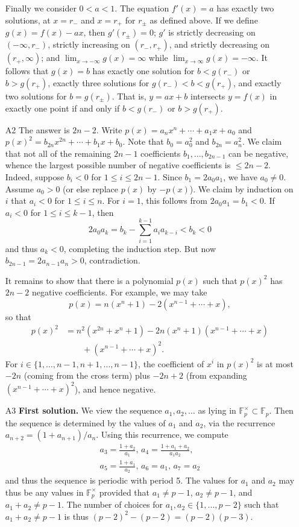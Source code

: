 \documentclass[amssymb,twocolumn,pra,10pt,aps]{revtex4-1}
\begin{document}
\begin{itemize}
Finally we consider $0<a<1$. The equation $f'(x) = a$ has exactly two solutions, at $x=r_-$ and $x=r_+$ for $r_{\pm}$ as defined above.
If we define $g(x) = f(x)-ax$, then $g'(r_\pm)=0$; $g'$ is strictly decreasing on $(-\infty,r_-)$, strictly increasing on $(r_-,r_+)$, and strictly decreasing on $(r_+,\infty)$; and $\lim_{x\to-\infty} g(x) = \infty$ while $\lim_{x\to\infty} g(x) = -\infty$. It follows that $g(x)=b$ has exactly one solution for $b<g(r_-)$ or $b>g(r_+)$, exactly three solutions for $g(r_-)<b<g(r_+)$, and exactly two solutions for $b = g(r_\pm)$. That is, $y=ax+b$ intersects $y=f(x)$ in exactly one point if and only if $b<g(r_-)$ or $b>g(r_+)$.

\item[A2]
The answer is $2n-2$. Write $p(x) = a_nx^n+\cdots+a_1x+a_0$ and $p(x)^2 = b_{2n}x^{2n}+\cdots+b_1x+b_0$. Note that $b_0 = a_0^2$ and $b_{2n} = a_n^2$. We claim that not all of the remaining $2n-1$ coefficients $b_1,\ldots,b_{2n-1}$ can be negative, whence the largest possible number of negative coefficients is $\leq 2n-2$. Indeed, suppose $b_i <0$ for $1\leq i\leq 2n-1$. Since $b_1 = 2a_0a_1$, we have $a_0 \neq 0$. Assume $a_0>0$ (or else replace $p(x)$ by $-p(x)$). We claim by induction on $i$ that $a_i < 0$ for $1\leq i\leq n$. For $i=1$, this follows from $2a_0a_1 = b_1<0$. If $a_i<0$ for $1\leq i\leq k-1$, then
\[
2a_0a_k = b_k - \sum_{i=1}^{k-1} a_i a_{k-i} < b_k < 0
\]
and thus $a_k<0$, completing the induction step. But now $b_{2n-1} = 2a_{n-1}a_n > 0$, contradiction.

It remains to show that there is a polynomial $p(x)$ such that $p(x)^2$ has $2n-2$ negative coefficients. For example, we may take
\[
p(x) = n(x^n+1) - 2(x^{n-1} + \cdots + x),
\]
so that
\begin{align*}
p(x)^2 &= n^2(x^{2n} + x^n + 1) - 2n(x^n+1)(x^{n-1}+\cdots+x)\\
&\qquad 
+ (x^{n-1} + \cdots + x)^2.
\end{align*}
For $i\in \{1,\dots,n-1,n+1,\dots,n-1\}$, the coefficient of $x^i$ in $p(x)^2$ is at most $-2n$ (coming from the cross term)
plus $-2n+2$ (from expanding $(x^{n-1} + \cdots + x)^2$), and hence negative.


\item[A3]
\textbf{First solution.}
We view the sequence $a_1,a_2,\ldots$ as lying in $\mathbb{F}_p^\times \subset \mathbb{F}_p$.  Then the sequence is determined by the values of $a_1$ and $a_2$, via the recurrence $a_{n+2}=(1+a_{n+1})/a_n$.  Using this recurrence, we compute
\begin{gather*}
a_3=\frac{1 + a_2}{a_1}, \, a_4 = \frac{1 + a_1 + a_2}{a_1 a_2}, \\
a_5=\frac{1 + a_1}{a_2}, \, a_6 = a_1, \, a_7 = a_2 
\end{gather*}
and thus the sequence is periodic with period 5.  The values for $a_1$ and $a_2$ may thus be any values in $\mathbb{F}_p^\times$ provided that $a_1\neq p-1$, $a_2\neq p-1$, and $a_1+a_2\neq p-1$.  The number of choices for $a_1,a_2\in\{1,\ldots,p-2\}$ such that $a_1+a_2\neq p-1$ is thus $(p-2)^2 - (p-2)= (p-2)(p-3)$.


\end{itemize}
\end{document}

